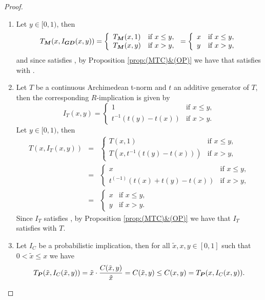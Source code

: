 \begin{proof}
	\begin{enumerate}[label=(\roman*)]
		\item  Let $y \in [0,1)$, then
		$$T_{\bm{M}}(x,I_{\bm{GD}}(x,y))
		=
		\left\{ \begin{array}{ll}
			T_{\bm{M}}(x,1) &   \text{if }   x \leq y , \\
			T_{\bm{M}}(x,y) & \text{if } x>y, 
		\end{array} \right.
		=
		\left\{ \begin{array}{ll}
			x &   \text{if }   x \leq y , \\
			y & \text{if } x>y, 
		\end{array} \right.
		$$
		and since \IGD satisfies \OP, by Proposition \ref{prop:(MTC)&(OP)}  we have that \IGD satisfies \MTC with \TM.
		\item Let $T$ be a continuous Archimedean t-norm and $t$ an additive generator of $T$, then the corresponding $R$-implication is given by
		$$ I_T(x,y) = \left\{ \begin{array}{ll}
			1 &   \text{if }   x \leq y , \\
			t^{-1}(t(y)-t(x)) & \text{if } x>y. 
		\end{array} \right.
		$$
		Let $y \in [0,1)$, then
		\begin{eqnarray*}
		T(x,I_T(x,y))
		&=&
		\left\{ \begin{array}{ll}
			T(x,1) &   \text{if }   x \leq y , \\
			T(x,t^{-1}(t(y)-t(x))) & \text{if } x>y, 
		\end{array} \right. \\
		&=&
		\left\{ \begin{array}{ll}
			x &   \text{if }   x \leq y , \\
			t^{(-1)}(t(x)+t(y)-t(x)) & \text{if } x>y, 
		\end{array} \right. \\
		&=&
		\left\{ \begin{array}{ll}
			x &   \text{if }   x \leq y , \\
			y & \text{if } x>y. 
		\end{array} \right.
		 \end{eqnarray*}
	 	Since $I_T$ satisfies \OP, by Proposition \ref{prop:(MTC)&(OP)}  we have that $I_T$ satisfies \MTC with $T$.
		\item Let $I_C$ be a probabilistic implication, then for all $\tilde{x},x,y \in [0,1]$ such that $0<\tilde{x} \leq x$ we have
		$$T_{\bm{P}}(\tilde{x},I_C(\tilde{x},y))=\tilde{x} \cdot  \frac{C(\tilde{x},y)}{\tilde{x}} = C(\tilde{x},y) \leq C(x,y) =  T_{\bm{P}}(x,I_C(x,y)).$$

\end{enumerate}
\end{proof}
